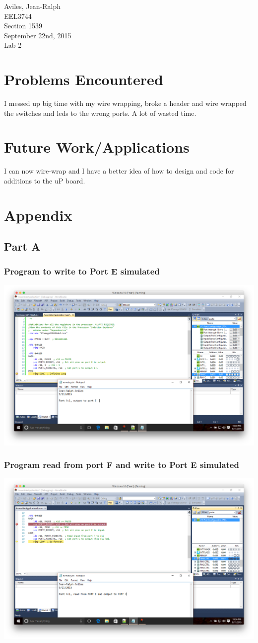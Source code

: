 \documentclass[letterpaper, 12pt]{article}
\newcommand{\hwnumber}{Lab 2}
\newcommand{\duedate}{September 22nd, 2015}
\newcommand{\capper}{\begin{flushright}Aviles, Jean-Ralph \\ EEL3744 \\ Section 1539 \\ \duedate{} \\ \hwnumber{}\end{flushright}}
\begin{document}
\capper{}
\section*{Problems Encountered}
I messed up big time with my wire wrapping, broke a header and wire wrapped the switches and leds to the wrong ports. A lot of wasted time.
\section*{Future Work/Applications}
I can now wire-wrap and I have a better idea of how to design and code for additions to the uP board.
\section*{Appendix}
\subsection*{Part A}
\subsubsection*{Program to write to Port E simulated}
\includegraphics[width=\textwidth]{parta_1}
\subsubsection*{Program read from port F and write to Port E simulated}
\includegraphics[width=\textwidth]{parta_2}
\end{document}
